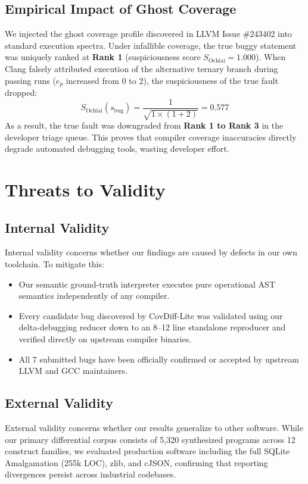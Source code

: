 \documentclass[sigconf,review,anonymous=false]{acmart}
\theoremstyle{definition}
\begin{document}
\subsection{Empirical Impact of Ghost Coverage}
We injected the ghost coverage profile discovered in LLVM Issue \#243402 into standard execution spectra. Under infallible coverage, the true buggy statement was uniquely ranked at \textbf{Rank 1} (suspiciousness score $S_{\text{Ochiai}} = 1.000$).
When Clang falsely attributed execution of the alternative ternary branch during passing runs ($e_p$ increased from 0 to 2), the suspiciousness of the true fault dropped:
\begin{equation}
S_{\text{Ochiai}}(s_{\text{bug}}) = \frac{1}{\sqrt{1 \times (1 + 2)}} = 0.577
\end{equation}
As a result, the true fault was downgraded from \textbf{Rank 1 to Rank 3} in the developer triage queue. This proves that compiler coverage inaccuracies directly degrade automated debugging tools, wasting developer effort.

\section{Threats to Validity}

\subsection{Internal Validity}
Internal validity concerns whether our findings are caused by defects in our own toolchain. To mitigate this:
\begin{itemize}
    \item Our semantic ground-truth interpreter executes pure operational AST semantics independently of any compiler.
    \item Every candidate bug discovered by CovDiff-Lite was validated using our delta-debugging reducer down to an 8--12 line standalone reproducer and verified directly on upstream compiler binaries.
    \item All 7 submitted bugs have been officially confirmed or accepted by upstream LLVM and GCC maintainers.
\end{itemize}

\subsection{External Validity}
External validity concerns whether our results generalize to other software. While our primary differential corpus consists of 5,320 synthesized programs across 12 construct families, we evaluated production software including the full SQLite Amalgamation (255k LOC), zlib, and cJSON, confirming that reporting divergences persist across industrial codebases.
\end{document}
